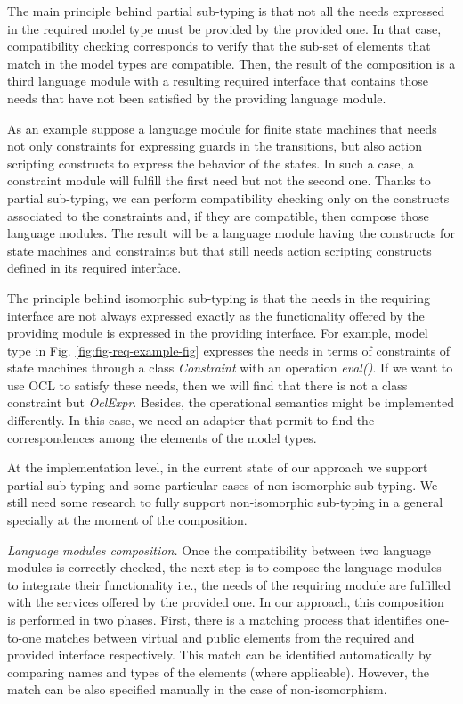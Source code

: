 The main principle behind partial sub-typing is that not all the needs expressed in the required model type must be provided by the provided one. In that case, compatibility checking corresponds to verify that the sub-set of elements that match in the model types are compatible. Then, the result of the composition is a third language module with a resulting required interface that contains those needs that have not been satisfied by the providing language module. 

As an example suppose a language module for finite state machines that needs not only constraints for expressing guards in the transitions, but also action scripting constructs to express the behavior of the states. In such a case, a constraint module will fulfill the first need but not the second one. Thanks to partial sub-typing, we can perform compatibility checking only on the constructs associated to the constraints and, if they are compatible, then compose those language modules. The result will be a language module having the constructs for state machines and constraints but that still needs action scripting constructs defined in its required interface.

The principle behind isomorphic sub-typing is that the needs in the requiring interface are not always expressed exactly as the functionality offered by the providing module is expressed in the providing interface. For example, model type in Fig. \ref{fig:fig-req-example-fig} expresses the needs in terms of constraints of state machines through a class \textsl{Constraint} with an operation \textsl{eval()}. If we want to use OCL to satisfy these needs, then we will find that there is not a class constraint but \textsl{OclExpr}. Besides, the operational semantics might be implemented differently. In this case, we need an adapter that permit to find the correspondences among the elements of the model types. 

At the implementation level, in the current state of our approach we support partial sub-typing and some particular cases of non-isomorphic sub-typing. We still need some research to fully support non-isomorphic sub-typing in a general specially at the moment of the composition. 

\vspace{2mm}
\textit{Language modules composition.} Once the compatibility between two language modules is correctly checked, the next step is to compose the language modules to integrate their functionality i.e., the needs of the requiring module are fulfilled with the services offered by the provided one.  In our approach, this composition is performed in two phases. First, there is a matching process that identifies one-to-one matches between virtual and public elements from the required and provided interface respectively. This match can be identified automatically by comparing names and types of the elements (where applicable). However, the match can be also specified manually in the case of non-isomorphism.

